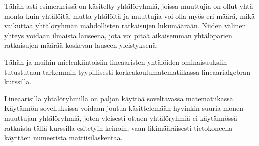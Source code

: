 Tähän asti esimerkeissä on käsitelty yhtälöryhmiä, joissa muuttujia on ollut yhtä monta kuin yhtälöitä, mutta yhtälöitä ja muuttujia voi olla myös eri määrä, mikä vaikuttaa yhtälöryhmän mahdollisten ratkaisujen lukumäärään. Niiden välinen yhteys voidaan ilmaista lauseena, jota voi pitää aikaisemman yhtälöparien ratkaisujen määrää koskevan lauseen yleistyksenä:

Tähän ja muihin mielenkiintoisiin lineaaristen yhtälöiden ominaisuuksiin tutustutaan tarkemmin tyypillisesti korkeakoulumatematiikassa lineaarialgebran kurssilla.

Lineaarisilla yhtälöryhmillä on paljon käyttöä soveltavassa matematiikassa. Käytännön sovelluksissa voidaan joutua käsittelemään hyvinkin suuria monen muuttujan yhtälöryhmiä, joten yleisesti ottaen yhtälöryhmiä ei käytännössä ratkaista tällä kurssilla esitetyin keinoin, vaan likimääräisesti tietokoneella käyttäen numeerista matriisilaskentaa.


